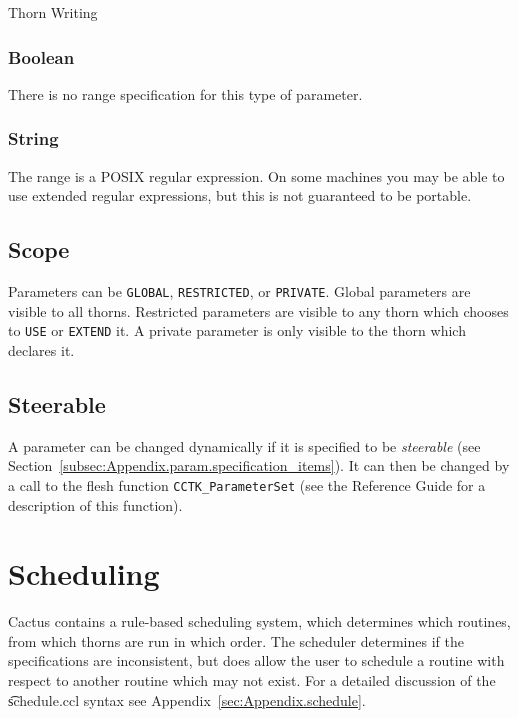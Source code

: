 \begin{cactuspart}{Thorn Writing}
\subsubsection{Boolean}

There is no range specification for this type of parameter.

\subsubsection{String}

The range is a POSIX regular expression.  On some machines you may be
able to use extended regular expressions, but this is not guaranteed
to be portable.


\subsection{Scope}
\label{sec:Cactus_parameters.scope}

Parameters can be \texttt{GLOBAL}, \texttt{RESTRICTED}, or \texttt{PRIVATE}.
Global parameters are visible to all thorns.  Restricted parameters
are visible to any thorn which chooses to \texttt{USE} or \texttt{EXTEND}
it.  A private parameter is only visible to the thorn which declares
it.

\subsection{Steerable}
\label{sec:Cactus_parameters.steerable}
A parameter can be changed dynamically if it is specified to be
\textit{steerable} (see
Section~\ref{subsec:Appendix.param.specification_items}).
It can then be changed by a call to the flesh function
\texttt{CCTK\_ParameterSet} (see the Reference Guide for a description
of this function).


\section{Scheduling}
\label{chap:scheduling}

Cactus contains a rule-based scheduling system, which determines which
routines, from which thorns are run in which order.  The scheduler
determines if the specifications are inconsistent, but does allow the
user to schedule a routine with respect to another routine which may not
exist.
For a detailed discussion of the {\t schedule.ccl} syntax see
Appendix~\ref{sec:Appendix.schedule}.


\end{cactuspart}
